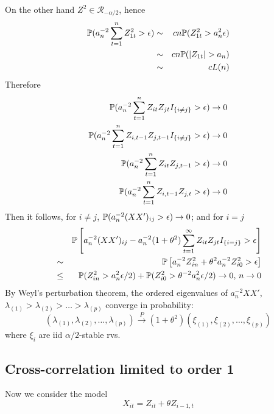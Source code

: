 \documentclass{article}
\begin{document}
On the other hand $Z^2 \in \mathcal R_{-\alpha/2}$, hence
\begin{eqnarray*}
  \mathbb{P}(a_n^{-2} \sum_{t=1}^n Z_{1t}^2 > \epsilon) &\sim& c n
  \mathbb{P}(Z_{1t}^2 > a_n^2 \epsilon) \\
  &\sim& c n \mathbb{P}(|Z_{1t}| > a_n) \\
  &\sim& c L(n)
\end{eqnarray*}
Therefore
\begin{eqnarray*}
  \mathbb{P}(a_n^{-2} \sum_{t=1}^n Z_{it} Z_{jt}I_{\{i \neq j\}} > \epsilon) \to
  0 \\
  \mathbb{P}(a_n^{-2} \sum_{t=1}^n Z_{i,t-1} Z_{j,t-1} I_{\{i \neq j\}} >
  \epsilon) \to 0 \\
  \mathbb{P}(a_n^{-2} \sum_{t=1}^n Z_{it} Z_{j,t-1} > \epsilon) \to 0
  \\
  \mathbb{P}(a_n^{-2} \sum_{t=1}^n Z_{i, t-1} Z_{j,t} > \epsilon) \to 0
\end{eqnarray*}
Then it follows, for $i \neq j$, $\mathbb{P}(a_n^{-2} (XX')_{ij} >
\epsilon) \to 0$; and for $i=j$
\begin{eqnarray*}
  && \mathbb{P}\left[ a_n^{-2} (XX')_{ij} - a_n^{-2} (1 + \theta^2)\sum_{t=1}^\infty
      Z_{it}Z_{jt} I_{\{i=j\}} > \epsilon \right] \\
  &\sim& \mathbb{P}\left[ a_n^{-2} Z_{in}^2 + \theta^2 a_n^{-2} Z_{i0}^2 >
    \epsilon \right] \\
  &\leq& \mathbb{P}(Z_{in}^2 > a_n^2 \epsilon/2) + \mathbb{P}(Z_{i0}^2 > \theta^{-2}
  a_n^2 \epsilon/2) \to 0 \text{, } n \to 0\\
\end{eqnarray*}
By Weyl's perturbation theorem, the ordered eigenvalues of
$a_n^{-2}XX'$, $\lambda_{(1)} > \lambda_{(2)} > \dots >
\lambda_{(p)}$ converge in probability:
\[
(\lambda_{(1)}, \lambda_{(2)}, \dots, \lambda_{(p)}) \xrightarrow{P}
(1+\theta^2)(\xi_{(1)}, \xi_{(2)}, \dots, \xi_{(p)})
\]
where $\xi_i$ are iid $\alpha/2$-stable rvs.
\subsection{Cross-correlation limited to order 1}
Now we consider the model
\[
X_{it} = Z_{it} + \theta Z_{i-1,t}
\]
\end{document}
